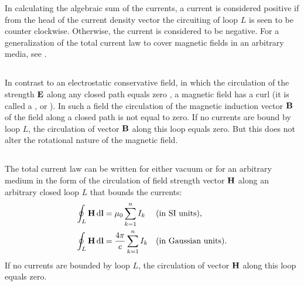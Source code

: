 In calculating the algebraic sum of the currents, a current is considered positive if from the head of the current density vector  the circuiting of loop $L$ is seen to be counter­ clockwise. Otherwise, the current is considered to be negative. For a generalization of the total current law to cover magnetic fields in an arbitrary media, see .

\subsection{}\label{23.5.3} In contrast to an electrostatic conservative field, in which the circulation of the strength $\vb{E}$ along any closed path equals zero , a magnetic field has a curl (it is called a ,  or ). In such a field the circulation of the magnetic induction vector $\vb{B}$ of the field along a closed path is not equal to zero. If no currents are bound by loop $L$, the circulation of vector $\vb{B}$ along this loop equals zero. But this does not alter the rotational nature of the magnetic field.

\subsection{}\label{23.5.4} The total current law can be written for either vacuum or for an arbitrary medium in the form of the circulation of field strength vector $\vb{H}$  along an arbitrary closed loop $L$ that bounds the currents:
\begin{align*}%
\oint_{L} \vb{H}\, \dd \vb{l}  & = \mu_{0} \sum_{k =1}^{n}I_{k} &&  \text{(in SI units),} \\
\oint_{L} \vb{H}\, \dd \vb{l}  & =  \frac{4 \pi}{c} \sum_{k =1}^{n}I_{k} &&  \text{(in Gaussian units).}
\end{align*}
If no currents are bounded by loop $L$, the circulation of vector $\vb{H}$ along this loop equals zero.

